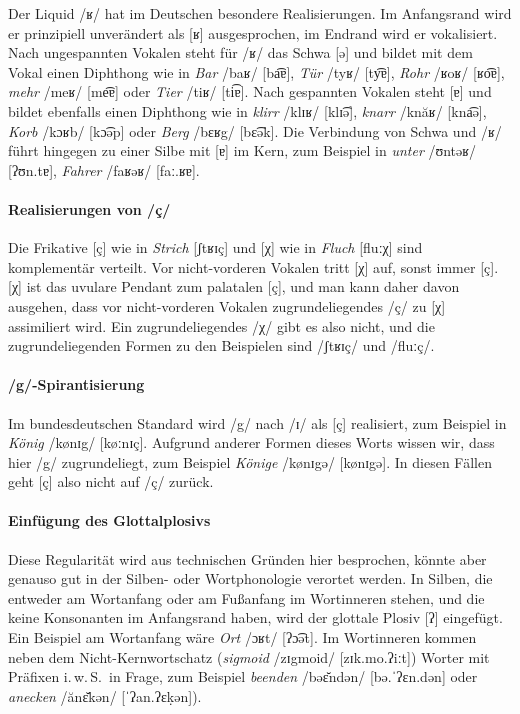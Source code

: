 Der Liquid /ʁ/ hat im Deutschen besondere Realisierungen.
Im Anfangsrand wird er prinzipiell unverändert als [ʁ] ausgesprochen, im Endrand wird er vokalisiert.
Nach ungespannten Vokalen steht für /ʁ/ das Schwa [ə] und bildet mit dem Vokal einen Diphthong wie in \textit{Bar} /baʁ/ [ba͡ɐ], \textit{Tür} /tyʁ/ [ty͡ɐ], \textit{Rohr} /ʁoʁ/ [ʁo͡ɐ], \textit{mehr} /meʁ/ [me͡ɐ] oder \textit{Tier} /tiʁ/ [ti͡ɐ].
Nach gespannten Vokalen steht [ɐ] und bildet ebenfalls einen Diphthong wie in \textit{klirr} /klɪʁ/ [klɪ͡ə], \textit{knarr} /knăʁ/ [kna͡ə], \textit{Korb} /kɔʁb/ [kɔ͡əp] oder \textit{Berg} /bɛʁg/ [bɛ͡ək].
Die Verbindung von Schwa und /ʁ/ führt hingegen zu einer Silbe mit [ɐ] im Kern, zum Beispiel in \textit{unter} /ʊntəʁ/ [ʔʊn.tɐ], \textit{Fahrer} /faʁəʁ/ [faː.ʁɐ].

\paragraph*{Realisierungen von /ç/}

Die Frikative [ç] wie in \textit{Strich} [ʃtʁɪç] und [χ] wie in \textit{Fluch} [fluːχ] sind komplementär verteilt.
Vor nicht-vorderen Vokalen tritt [χ] auf, sonst immer [ç].
[χ] ist das uvulare Pendant zum palatalen [ç], und man kann daher davon ausgehen, dass vor nicht-vorderen Vokalen zugrundeliegendes /ç/ zu [χ] assimiliert wird.
Ein zugrundeliegendes /χ/ gibt es also nicht, und die zugrundeliegenden Formen zu den Beispielen sind /ʃtʁɪç/ und /fluːç/.

\paragraph*{/g/-Spirantisierung}

Im bundesdeutschen Standard wird /g/ nach /ɪ/ als [ç] realisiert, zum Beispiel in \textit{König} /kønɪg/ [køːnɪç].
Aufgrund anderer Formen dieses Worts wissen wir, dass hier /g/ zugrundeliegt, zum Beispiel \textit{Könige} /kønɪgə/ [kønɪgə].
In diesen Fällen geht [ç] also nicht auf /ç/ zurück.

\paragraph*{Einfügung des Glottalplosivs}

Diese Regularität wird aus technischen Gründen hier besprochen, könnte aber genauso gut in der Silben- oder Wortphonologie verortet werden.
In Silben, die entweder am Wortanfang oder am Fußanfang im Wortinneren stehen, und die keine Konsonanten im Anfangsrand haben, wird der glottale Plosiv [ʔ] eingefügt.
Ein Beispiel am Wortanfang wäre \textit{Ort} /ɔʁt/ [ʔɔ͡ət].
Im Wortinneren kommen neben dem Nicht-Kernwortschatz (\textit{sigmoid} /zɪgmoid/ [zɪk.mo.ʔiːt]) Worter mit Präfixen i.\,w.\,S.\ in Frage, zum Beispiel \textit{beenden} /bəɛ̆ndən/ [bə.ˈʔɛn.dən] oder \textit{anecken} /ănɛ̆kən/ [ˈʔan.ʔɛḳən]).

